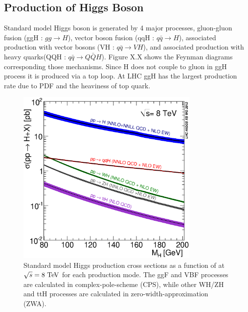 \subsection{Production of Higgs Boson}
Standard model Higgs boson is generated by 4 major processes, 
gluon-gluon fusion (ggH : $gg \rightarrow H$), 
vector boson fusion (qqH : $q\bar{q}\rightarrow H$),
associated production with vector bosons (VH : $q\bar{q}\rightarrow VH$), and 
associated production with heavy quarks(QQH : $q\bar{q}\rightarrow Q\bar{Q}H$). 
Figure X.X shows the Feynman diagrams corresponding those mechanisms.
Since H does not couple to gluon in ggH process it is produced via a top loop.
At LHC ggH has the largest production rate due to PDF and 
the heaviness of top quark. 
\begin{figure}[t]
\centering
\includegraphics[width=0.8\textwidth]{figures/Higgs_XS_8TeV_LM200.eps}
\caption{ Standard model Higgs production cross sections 
as a function of \mHi{} at $\sqrt{s}=8~\mathrm{Te\kern -0.1em V}$ for each 
production mode. %
The ggF and VBF processes are 
calculated in complex-pole-scheme (CPS), while other WH/ZH and ttH processes 
are calculated in zero-width-approximation (ZWA). }
\label{fig:Higgs_XS_8TeV_LM200}
\end{figure}

